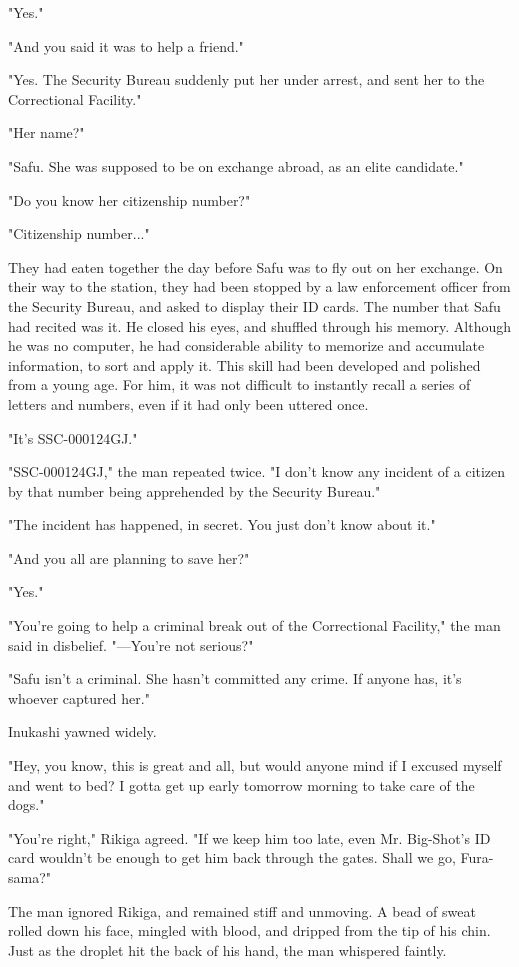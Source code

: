 "Yes."

"And you said it was to help a friend."

"Yes. The Security Bureau suddenly put her under arrest, and sent her to
the Correctional Facility."

"Her name?"

"Safu. She was supposed to be on exchange abroad, as an elite
candidate."

"Do you know her citizenship number?"

"Citizenship number..."

They had eaten together the day before Safu was to fly out on her
exchange. On their way to the station, they had been stopped by a law
enforcement officer from the Security Bureau, and asked to display their
ID cards. The number that Safu had recited was it. He closed his eyes,
and shuffled through his memory. Although he was no computer, he had
considerable ability to memorize and accumulate information, to sort and
apply it. This skill had been developed and polished from a young age.
For him, it was not difficult to instantly recall a series of letters
and numbers, even if it had only been uttered once.

"It's SSC-000124GJ."

"SSC-000124GJ," the man repeated twice. "I don't know any incident of a
citizen by that number being apprehended by the Security Bureau."

"The incident has happened, in secret. You just don't know about it."

"And you all are planning to save her?"

"Yes."

"You're going to help a criminal break out of the Correctional
Facility," the man said in disbelief. "---You're not serious?"

"Safu isn't a criminal. She hasn't committed any crime. If anyone has,
it's whoever captured her."

Inukashi yawned widely.

"Hey, you know, this is great and all, but would anyone mind if I
excused myself and went to bed? I gotta get up early tomorrow morning to
take care of the dogs."

"You're right," Rikiga agreed. "If we keep him too late, even Mr.
Big-Shot's ID card wouldn't be enough to get him back through the gates.
Shall we go, Fura-sama?"

The man ignored Rikiga, and remained stiff and unmoving. A bead of sweat
rolled down his face, mingled with blood, and dripped from the tip of
his chin. Just as the droplet hit the back of his hand, the man
whispered faintly.

